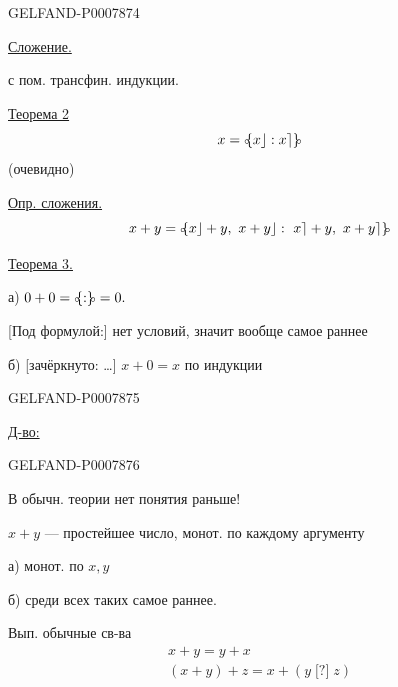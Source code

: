 \begin{GelfandAdjacentEvidence}{GELFAND-P000787}{4}


\underline{Сложение.}

с пом. трансфин. индукции.

\underline{Теорема 2}
\[
x=\mathopen{{\scriptstyle\circ}\mkern-5mu\{} x\rfloor:x\rceil \mathclose{\}\mkern-5mu{\scriptstyle\circ}}
\]
(очевидно)

\underline{Опр. сложения.}
\[
x+y=\mathopen{{\scriptstyle\circ}\mkern-5mu\{} x\rfloor+y,\ x+y\rfloor:\ x\rceil+y,\ x+y\rceil \mathclose{\}\mkern-5mu{\scriptstyle\circ}}
\]

\underline{Теорема 3.}

а) \(0+0=\mathopen{{\scriptstyle\circ}\mkern-5mu\{} : \mathclose{\}\mkern-5mu{\scriptstyle\circ}}=0.\)

[Под формулой:] нет условий, значит вообще самое раннее

б) [зачёркнуто: \ldots{}] \(x+0=x\) по индукции
\end{GelfandAdjacentEvidence}
\begin{GelfandAdjacentEvidence}{GELFAND-P000787}{5}


\underline{Д-во:}
\end{GelfandAdjacentEvidence}
\begin{GelfandAdjacentEvidence}{GELFAND-P000787}{6}


В обычн. теории нет понятия раньше!

\(x+y\) --- простейшее число, монот. по каждому аргументу

а) монот. по \(x,y\)

б) среди всех таких самое раннее.

Вып. обычные св-ва
\begin{gather*}
x+y=y+x\\
(x+y)+z=x+(y\mathbin{\text{[?]}}z)
\end{gather*}
\end{GelfandAdjacentEvidence}


